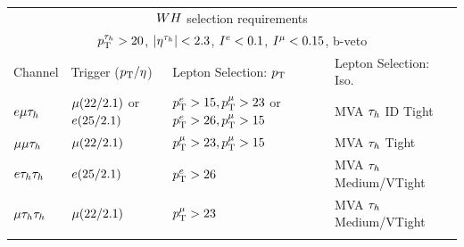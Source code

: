 \begin{table}[htbp]
\centering
\begin{small}
\begin{tabular}{llll}
     \multicolumn{4}{c}{$WH$ selection requirements}                 \\ 
     \multicolumn{4}{c}{$p_\mathrm{T}^{\tau_{h}}>20$, $|\eta^{\tau_{h}}|<2.3$, $I^{e}<0.1$, $I^{\mu}<0.15$, b-veto }                 \\ 
\hline
  Channel           &         Trigger ($p_\mathrm{T}/\eta$)         & Lepton Selection: $p_\mathrm{T}$   & Lepton Selection: Iso.  \\
\hline
 $e\mu\tau_{h}$      &  $\mu (22/2.1)$ or $e (25/2.1)$  &     $p_\mathrm{T}^{e}>15, p_\mathrm{T}^{\mu}>23$ or $p_\mathrm{T}^{e}>26, p_\mathrm{T}^{\mu}>15$ &  MVA $\tau_{h}$ ID Tight  \\
 $\mu\mu\tau_{h}$     &  $\mu (22/2.1)$                    &     $p_\mathrm{T}^{\mu}>23,p_\mathrm{T}^{\mu}>15$                              &  MVA $\tau_{h}$  Tight  \\
 $e\tau_{h}\tau_{h}$     &  $e (25/2.1)$                     &     $p_\mathrm{T}^{e}>26$                                           &   MVA $\tau_{h}$ Medium/VTight  \\
 $\mu\tau_{h}\tau_{h}$    &  $\mu (22/2.1)$                    &     $p_\mathrm{T}^{\mu}>23$                                          &  MVA $\tau_{h}$ Medium/VTight  \\
\hline \\


\end{tabular}
\end{small}
\end{table}

